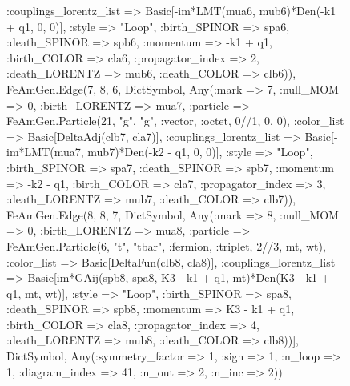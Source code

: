 \documentclass{revtex4}
\begin{document}
\begin{figure}[!htb]
\begin{center}
{:couplings_lorentz_list => Basic[-im*LMT(mua6, mub6)*Den(-k1 + q1, 0, 0)], :style => "Loop", :birth_SPINOR => spa6, :death_SPINOR => spb6, :momentum => -k1 + q1, :birth_COLOR => cla6, :propagator_index => 2, :death_LORENTZ => mub6, :death_COLOR => clb6)), FeAmGen.Edge(7, 8, 6, Dict{Symbol, Any}(:mark => 7, :null_MOM => 0, :birth_LORENTZ => mua7, :particle => FeAmGen.Particle(21, "g", "g", :vector, :octet, 0//1, 0, 0), :color_list => Basic[DeltaAdj(clb7, cla7)], :couplings_lorentz_list => Basic[-im*LMT(mua7, mub7)*Den(-k2 - q1, 0, 0)], :style => "Loop", :birth_SPINOR => spa7, :death_SPINOR => spb7, :momentum => -k2 - q1, :birth_COLOR => cla7, :propagator_index => 3, :death_LORENTZ => mub7, :death_COLOR => clb7)), FeAmGen.Edge(8, 8, 7, Dict{Symbol, Any}(:mark => 8, :null_MOM => 0, :birth_LORENTZ => mua8, :particle => FeAmGen.Particle(6, "t", "tbar", :fermion, :triplet, 2//3, mt, wt), :color_list => Basic[DeltaFun(clb8, cla8)], :couplings_lorentz_list => Basic[im*GAij(spb8, spa8, K3 - k1 + q1, mt)*Den(K3 - k1 + q1, mt, wt)], :style => "Loop", :birth_SPINOR => spa8, :death_SPINOR => spb8, :momentum => K3 - k1 + q1, :birth_COLOR => cla8, :propagator_index => 4, :death_LORENTZ => mub8, :death_COLOR => clb8))], Dict{Symbol, Any}(:symmetry_factor => 1, :sign => 1, :n_loop => 1, :diagram_index => 41, :n_out => 2, :n_inc => 2)) 
}
\end{center}
\end{figure}
\end{document}
